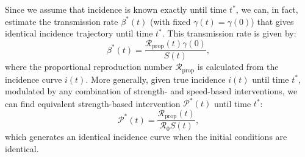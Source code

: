 \documentclass[12pt]{article}
\newcommand{\Rx}[1]{\ensuremath{{\mathcal R}_{#1}}\xspace}
\newcommand{\Ro}{\Rx{0}}
\newcommand{\Rprop}{\Rx{\mathrm{prop}}}
\newcommand{\PP}{\ensuremath{\mathcal P}}
\begin{document}
Since we assume that incidence is known exactly until time $t^\ast$, we can, in fact, estimate the transmission rate $\beta^\ast(t)$ (with fixed $\gamma(t)=\gamma(0)$) that gives identical incidence trajectory until time $t^\ast$.
This transmission rate is given by:
\begin{equation}
\beta^\ast(t) = \frac{\Rprop(t)\gamma(0)}{S(t)},
\end{equation}
where the proportional reproduction number $\Rprop$ is calculated from the incidence curve $i(t)$.
More generally, given true incidence $i(t)$ until time $t^\ast$, modulated by any combination of strength- and speed-based interventions, we can find equivalent strength-based intervention $\PP^\ast(t)$ until time $t^\ast$:
\begin{equation}
\PP^\ast(t) = \frac{\Rprop(t)}{\Ro S(t)},
\end{equation}
which generates an identical incidence curve when the initial conditions are identical.


\end{document}

